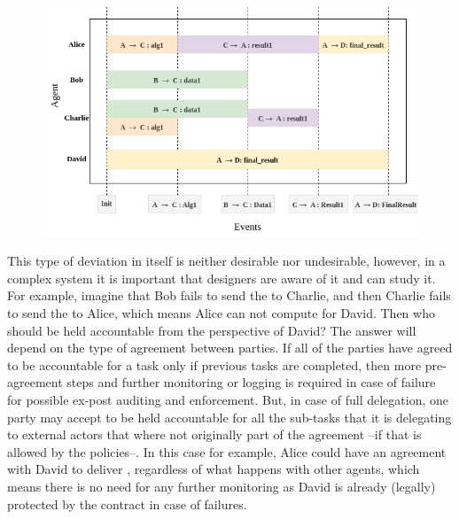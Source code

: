    

\begin{figure}[!tbh]
\centering
\begin{minipage}[b]{.9\linewidth}
  \centering
  \includegraphics[width=\textwidth]{ch_cmf/duties.drawio.png}
  \label{fig:dmp-example-duties}
\end{minipage}
\end{figure}

This type of deviation in itself is neither desirable nor undesirable, however, in a complex system it is important that designers are aware of it and can study it. For example, imagine that Bob fails to send the  to Charlie, and then Charlie fails to send the  to Alice, which means Alice can not compute  for David. Then who should be held accountable from the perspective of David? The answer will depend on the type of agreement between parties. If all of the parties have agreed to be accountable for a task only if previous tasks are completed, then more pre-agreement steps \cite{Baldoni2018} and further monitoring or logging is required in case of failure for possible ex-post auditing and enforcement. But, in case of full delegation, one party may accept to be held accountable for all the sub-tasks that it is delegating to external actors that where not originally part of the agreement --if that is allowed by the policies--. In this case for example, Alice could have an agreement with David to deliver , regardless of what happens with other agents, which means there is no need for any further monitoring as David is already (legally) protected by the contract in case of failures.

